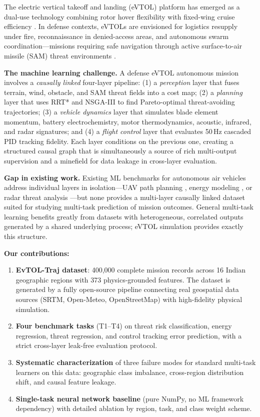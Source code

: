 \documentclass{article}
\theoremstyle{plain}
\theoremstyle{definition}
\begin{document}
The electric vertical takeoff and landing (eVTOL) platform has emerged as a
dual-use technology combining rotor hover flexibility with fixed-wing cruise
efficiency \citep{garrow2021urban,johnson2020nasa}.
In defense contexts, eVTOLs are envisioned for logistics resupply under fire,
reconnaissance in denied-access areas, and autonomous swarm coordination---missions
requiring safe navigation through active surface-to-air missile (SAM) threat
environments \citep{dod2022autonomy}.

\textbf{The machine learning challenge.}
A defense eVTOL autonomous mission involves a \emph{causally linked} four-layer
pipeline:
(1) a \emph{perception} layer that fuses terrain, wind, obstacle, and SAM threat
fields into a cost map;
(2) a \emph{planning} layer that uses RRT* \citep{karaman2011sampling} and
NSGA-III \citep{deb2014evolutionary} to find Pareto-optimal threat-avoiding
trajectories;
(3) a \emph{vehicle dynamics} layer that simulates blade element momentum,
battery electrochemistry, motor thermodynamics, acoustic, infrared, and
radar signatures; and
(4) a \emph{flight control} layer that evaluates 50\,Hz cascaded PID tracking fidelity.
Each layer conditions on the previous one, creating a structured causal graph
that is simultaneously a source of rich multi-output supervision and a minefield
for data leakage in cross-layer evaluation.

\textbf{Gap in existing work.}
Existing ML benchmarks for autonomous air vehicles address individual layers
in isolation---UAV path planning \citep{ong2021uav},
energy modeling \citep{rodrigues2021energy,nakamura2023energy},
or radar threat analysis \citep{bodner1994radar,skolnik2008radar}---but none
provides a multi-layer causally linked dataset suited for studying multi-task
prediction of mission outcomes.
General multi-task learning \citep{caruana1997multitask,ruder2017overview}
benefits greatly from datasets with heterogeneous, correlated outputs generated by
a shared underlying process; eVTOL simulation provides exactly this structure.

\textbf{Our contributions:}
\begin{enumerate}
  \item \textbf{EvTOL-Traj dataset}: 400{,}000 complete mission records
    across 16 Indian geographic regions with 373 physics-grounded features.
    The dataset is generated by a fully open-source pipeline connecting
    real geospatial data sources (SRTM, Open-Meteo, OpenStreetMap) with
    high-fidelity physical simulation.
  \item \textbf{Four benchmark tasks} (T1--T4) on threat risk classification,
    energy regression, threat regression, and control tracking error prediction,
    with a strict cross-layer leak-free evaluation protocol.
  \item \textbf{Systematic characterization} of three failure modes for
    standard multi-task learners on this data: geographic class imbalance,
    cross-region distribution shift, and causal feature leakage.
  \item \textbf{Single-task neural network baseline} (pure NumPy, no ML
    framework dependency) with detailed ablation by region, task, and
    class weight scheme.
\end{enumerate}
\end{document}
